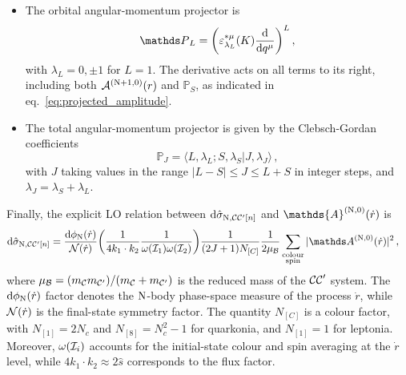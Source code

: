 \begin{itemize}
    \item
    The orbital angular-momentum projector is
        \begin{equation}
            {\mathds P}_{L} = \bigg( \varepsilon_{\lambda_L}^{*\mu}(K) \frac{{\rm d}}{{\rm d}q^\mu}\bigg)^L\,,
        \label{eq:proj_oam}
        \end{equation}
        with $\lambda_L = 0, \pm 1$ for $L=1$. The derivative acts on all terms to its right, including both ${\cal A}^{({\rm N}+1,0)}(r)$ and ${\mathds P}_{S}$, as indicated in eq.~\eqref{eq:projected_amplitude}.
    \item 
    The total angular-momentum projector is given by the Clebsch-Gordan coefficients
        \begin{equation}
            {\mathds P}_{J} = \langle L, \lambda_L; S, \lambda_S | J, \lambda_J \rangle\,,
        \label{eq:proj_tam}
        \end{equation}
        with $J$ taking values in the range $\vert L-S\vert\le J \le L+S$ in integer steps, and $\lambda_J = \lambda_S + \lambda_L$.\\
\end{itemize}
Finally, the explicit LO relation between $\mathrm{d}\hat\sigma_{{\rm N},{\cal C}{\cal C}^\prime[n]}$ and $\mathds{A}^{({\rm N},0)}(\dot{r})$ is 
\begin{align}
   \d\hat\sigma_{{\rm N},{\cal C}{\cal C}^\prime[n]} & =
   \frac{\d {\phi_{\rm N}}(\dot{r})}{{\cal N}(\dot{r})}\!\left(\frac{1}{4k_1\cdot k_2} \frac{1}{\omega(\Ione)\omega(\Itwo)} \right)\! \frac{1}{(2J+1)N_{[C]}} {\frac{1}{2\mu_{\cal B}}}
   \sum_{\substack{\rm colour\\ \rm spin}} |  {\mathds A}^{({\rm N},0)}(\dot{r})|^2\,,
\label{eq:partonic_xsec_explicit}
\end{align}
where $\mu_{{\cal B}} = (m_{{\cal C}}m_{{\cal C}^\prime})/(m_{{\cal C}}+m_{{\cal C}^\prime})$ is the reduced mass of the ${\cal C C}^\prime$ system. 
The $\mathrm{d}{\phi_{\rm N}}(\dot r)$ factor denotes the ${\rm N}$-body phase-space measure of the process $\dot r$, while ${\cal N}(\dot{r})$ is the final-state symmetry factor. The quantity $N_{[C]}$ is a colour factor, with $N_{[1]} = 2 N_c$ and ${N_{[8]} = N_c^2-1}$ for quarkonia, and $N_{[1]} = 1$ for leptonia. Moreover, $\omega({\cal I}_i)$ accounts for the initial-state colour and spin averaging at the $\dot{r}$ level, while $4k_1\cdot k_2 \approx 2\hat s$ corresponds to the flux factor.